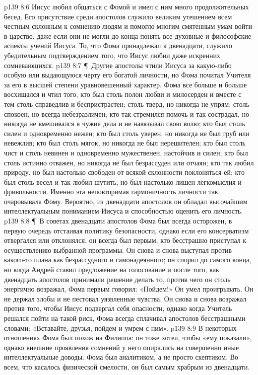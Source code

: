\vs p139 8:6 Иисус любил общаться с Фомой и имел с ним много продолжительных бесед. Его присутствие среди апостолов служило великим утешением всем честным склонным к сомнению людям и помогло многим смятенным умам войти в царство, даже если они не могли до конца понять все духовные и философские аспекты учений Иисуса. То, что Фома принадлежал к двенадцати, служило убедительным подтверждением того, что Иисус любил даже искренних сомневающихся.
\vs p139 8:7 \P\ Другие апостолы чтили Иисуса за какую\hyp{}либо особую или выдающуюся черту его богатой личности, но Фома почитал Учителя за его в высшей степени уравновешенный характер. Фома все больше и больше восхищался и чтил того, кто был столь полон любви и милосерден и вместе с тем столь справедлив и беспристрастен; столь тверд, но никогда не упрям; столь спокоен, но всегда небезразличен; кто так стремился помочь и так сострадал, но никогда не вмешивался в чужие дела и не навязывал свою волю; кто был столь силен и одновременно нежен; кто был столь уверен, но никогда не был груб или невежлив; кто был столь мягок, но никогда не был нерешителен; кто был столь чист и столь невинен и одновременно мужественен, настойчив и силен; кто был столь истинно отважен, но никогда не был безрассуден или отчаян; кто так любил природу, но был настолько свободен от всякой склонности поклоняться ей; кто был столь весел и так любил шутить, но был настолько лишен легкомыслия и фривольности. Именно эта неповторимая гармоничность личности так очаровывала Фому. Вероятно, из двенадцати апостолов он обладал высочайшим интеллектуальным пониманием Иисуса и способностью оценить его личность.
\vs p139 8:8 \P\ В советах двенадцати апостолов Фома был всегда осторожен, в первую очередь отстаивая политику безопасности, однако если его консерватизм отвергался или отклонялся, он всегда был первым, кто бесстрашно приступал к осуществлению выбранной программы. Он снова и снова выступал против какого\hyp{}то плана как безрассудного и самонадеянного; он спорил до самого конца, но когда Андрей ставил предложение на голосование и после того, как двенадцать апостолов принимали решение делать то, против чего он столь энергично возражал, Фома первым говорил: «Пойдем!» Он умел проигрывать. Он не держал злобы и не пестовал уязвленные чувства. Он снова и снова возражал против того, чтобы Иисус подвергал себя опасности, однако когда Учитель решался пойти на такой риск, Фома всегда сплачивал апостолов бесстрашными словами: «Вставайте, друзья, пойдем и умрем с ним».
\vs p139 8:9 В некоторых отношениях Фома был похож на Филиппа; он тоже хотел, чтобы «ему показали», однако внешние проявления сомнений у него опирались на совершенно иные интеллектуальные доводы. Фома был аналитиком, а не просто скептиком. Во всем, что касалось физической смелости, он был самым храбрым из двенадцати.
